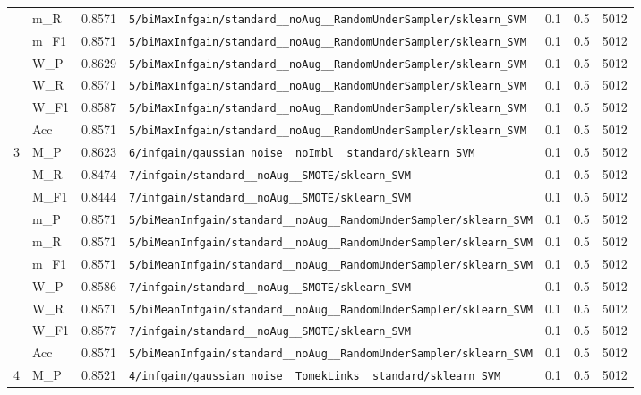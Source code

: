 \begin{table}[htbp]
\begin{tabular}{|c|l|c|>{\ttfamily\footnotesize}p{7.2cm}|c|c|c|}
 & m\_R & 0.8571 & \texttt{5/biMaxInfgain/standard\_\_noAug\_\_RandomUnderSampler/sklearn\_SVM} & 0.1 & 0.5  & 5012 \\ 
 & m\_F1 & 0.8571 & \texttt{5/biMaxInfgain/standard\_\_noAug\_\_RandomUnderSampler/sklearn\_SVM} & 0.1 & 0.5  & 5012 \\ 
 & W\_P & 0.8629 & \texttt{5/biMaxInfgain/standard\_\_noAug\_\_RandomUnderSampler/sklearn\_SVM} & 0.1 & 0.5  & 5012 \\ 
 & W\_R & 0.8571 & \texttt{5/biMaxInfgain/standard\_\_noAug\_\_RandomUnderSampler/sklearn\_SVM} & 0.1 & 0.5  & 5012 \\ 
 & W\_F1 & 0.8587 & \texttt{5/biMaxInfgain/standard\_\_noAug\_\_RandomUnderSampler/sklearn\_SVM} & 0.1 & 0.5  & 5012 \\ 
 & Acc & 0.8571 & \texttt{5/biMaxInfgain/standard\_\_noAug\_\_RandomUnderSampler/sklearn\_SVM} & 0.1 & 0.5  & 5012 \\ 
\hline
\multirow{10}{*}{3} & M\_P & 0.8623 & \texttt{6/infgain/gaussian\_noise\_\_noImbl\_\_standard/sklearn\_SVM} & 0.1 & 0.5  & 5012 \\ 
 & M\_R & 0.8474 & \texttt{7/infgain/standard\_\_noAug\_\_SMOTE/sklearn\_SVM} & 0.1 & 0.5  & 5012 \\ 
 & M\_F1 & 0.8444 & \texttt{7/infgain/standard\_\_noAug\_\_SMOTE/sklearn\_SVM} & 0.1 & 0.5  & 5012 \\ 
 & m\_P & 0.8571 & \texttt{5/biMeanInfgain/standard\_\_noAug\_\_RandomUnderSampler/sklearn\_SVM} & 0.1 & 0.5  & 5012 \\ 
 & m\_R & 0.8571 & \texttt{5/biMeanInfgain/standard\_\_noAug\_\_RandomUnderSampler/sklearn\_SVM} & 0.1 & 0.5  & 5012 \\ 
 & m\_F1 & 0.8571 & \texttt{5/biMeanInfgain/standard\_\_noAug\_\_RandomUnderSampler/sklearn\_SVM} & 0.1 & 0.5  & 5012 \\ 
 & W\_P & 0.8586 & \texttt{7/infgain/standard\_\_noAug\_\_SMOTE/sklearn\_SVM} & 0.1 & 0.5  & 5012 \\ 
 & W\_R & 0.8571 & \texttt{5/biMeanInfgain/standard\_\_noAug\_\_RandomUnderSampler/sklearn\_SVM} & 0.1 & 0.5  & 5012 \\ 
 & W\_F1 & 0.8577 & \texttt{7/infgain/standard\_\_noAug\_\_SMOTE/sklearn\_SVM} & 0.1 & 0.5  & 5012 \\ 
 & Acc & 0.8571 & \texttt{5/biMeanInfgain/standard\_\_noAug\_\_RandomUnderSampler/sklearn\_SVM} & 0.1 & 0.5  & 5012 \\ 
\hline
\multirow{10}{*}{4} & M\_P & 0.8521 & \texttt{4/infgain/gaussian\_noise\_\_TomekLinks\_\_standard/sklearn\_SVM} & 0.1 & 0.5  & 5012 \\ 

\end{tabular}
\end{table}
